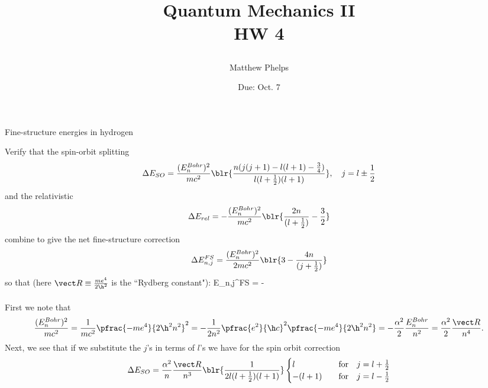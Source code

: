 \documentclass[10pt,letterpaper]{article}
\title{\begin{spacing}{1.2}Quantum Mechanics II\\HW 4\end{spacing}}
\author{Matthew Phelps}
\date{Due: Oct. 7}
\begin{document}
\maketitle

\benum
  	\item 
	Fine-structure energies in hydrogen
	\benum
		\item
		Verify that the spin-orbit splitting
		\[
			\Delta E_{SO} = \frac{(E_n^{Bohr})^2}{mc^2}\blr{\frac{n(j(j+1)-l(l+1)-\frac{3}{4})}{l(l+\frac{1}{2})
			(l+1)}}, \quad j = l \pm \frac{1}{2}
		\]
		and the relativistic 
		\[
			\Delta E_{rel} = -\frac{(E_n^{Bohr})^2}{mc^2}\blr{\frac{2n}{(l+\frac{1}{2})}-\frac{3}{2}}
		\]
		combine to give the net fine-structure correction
		\[
			\Delta E_{n,j}^{FS} = \frac{(E_n^{Bohr})^2}{2mc^2}\blr{3-\frac{4n}{(j+\frac{1}{2})}}
		\]
		so that (here $\vect R \equiv \frac{me^4}{2\h^2}$ is the ``Rydberg constant"):
		\be\label{1}
			E_{n,j}^{FS} = -
		\ee
		\\
		\\
		First we note that
		\[
			 \frac{(E_n^{Bohr})^2}{mc^2} =\frac{1}{mc^2} \pfrac{-me^4}{2\h^2 n^2}^2 = -\frac{1}{2n^2}
			 \pfrac{e^2}{\h c}^2\pfrac{-me^4}{2\h^2 n^2} = -\frac{\alpha^2}{2}\frac{E_n^{Bohr}}{n^2} 
			 = \frac{\alpha^2}{2}\frac{\vect R}{n^4}.
		\]
		Next, we see that if we substitute the $j$'s in terms of $l$'s we have for the spin orbit correction
		\[
			\Delta E_{SO} = \frac{\alpha^2}{n}\frac{\vect R}{n^3} \blr{\frac{1}{2l(l+\frac{1}{2})
			(l+1)}}\begin{cases}l&\quad\text{for}\quad j = l+\frac{1}{2}\\-(l+1)&\quad\text{for}\quad j = l-\frac{1}{2}
			\end{cases}
		\]
			
\end{document}
